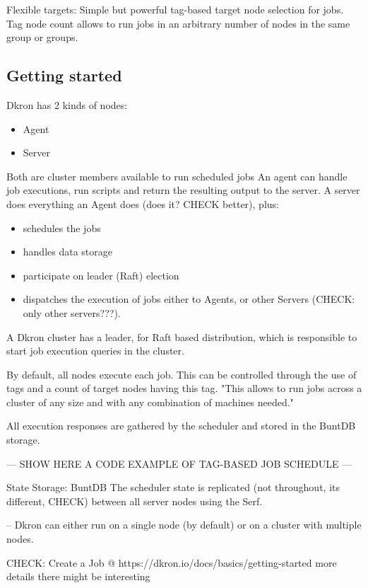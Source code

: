 \documentclass[runningheads]{llncs}
\begin{document}
Flexible targets: Simple but powerful tag-based target node selection for jobs. Tag node count allows to run jobs in an arbitrary number of nodes in the same group or groups.


\subsection{Getting started}
Dkron has 2 kinds of nodes:
\begin{itemize}
    \item Agent
    \item Server
\end{itemize}
Both are cluster members available to run scheduled jobs
An agent can handle job executions, run scripts and return the resulting output to the server.
A server does everything an Agent does (does it? CHECK better), plus:
\begin{itemize}
    \item schedules the jobs
    \item handles data storage
    \item participate on leader (Raft) election
    \item dispatches the execution of jobs either to Agents, or other Servers (CHECK: only other servers???).
\end{itemize}

A Dkron cluster has a leader, for Raft based distribution, which is responsible to start job execution queries in the cluster.

By default, all nodes execute each job. This can be controlled through the use of tags and
a count of target nodes having this tag. "This allows to run jobs across a cluster of any size and with any
combination of machines needed."

All execution responses are gathered by the scheduler and stored in the BuntDB storage.

--- SHOW HERE A CODE EXAMPLE OF TAG-BASED JOB SCHEDULE ---

State Storage: BuntDB
The scheduler state is replicated (not throughout, its different, CHECK) between all server nodes using the Serf.

--
Dkron can either run on a single node (by default) or on a cluster with multiple nodes.

CHECK: Create a Job @ https://dkron.io/docs/basics/getting-started more details there might be interesting
\end{document}

